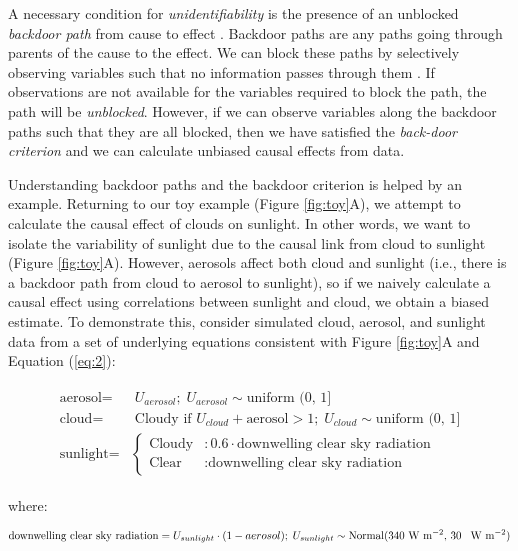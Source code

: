 \documentclass[12pt]{article}
\begin{document}
A necessary condition for \emph{unidentifiability} is the presence of
an unblocked \emph{backdoor path} from cause to effect \citep[][,
Ch. 3]{pearl2009causality}. Backdoor paths are any paths going
through parents of the cause to the effect. We can block these paths
by selectively observing variables such that no information passes
through them \citep{geiger-d-sep}. If observations are not available
for the variables required to block the path, the path will be
\emph{unblocked}. However, if we can observe variables along the
backdoor paths such that they are all blocked, then we have satisfied
the \emph{back-door criterion} \citep{pearl2009} and we can calculate
unbiased causal effects from data.

Understanding backdoor paths and the backdoor criterion is helped by
an example. Returning to our toy example (Figure \ref{fig:toy}A), we
attempt to calculate the causal effect of clouds on sunlight. In other
words, we want to isolate the variability of sunlight due to the
causal link from cloud to sunlight (Figure \ref{fig:toy}A). However,
aerosols affect both cloud and sunlight (i.e., there is a backdoor
path from cloud to aerosol to sunlight), so if we naively calculate a
causal effect using correlations between sunlight and cloud, we obtain
a biased estimate. To demonstrate this, consider simulated cloud,
aerosol, and sunlight data from a set of underlying equations
consistent with Figure \ref{fig:toy}A and Equation (\ref{eq:2}):


\begin{align}
  \begin{split}
    \text{aerosol} =& \; U_{aerosol}; \; U_{aerosol} \sim
    \text{uniform (0, 1]}\\ \text{cloud} =& \; \text{Cloudy if } U_{cloud} +
    \text{aerosol} > 1; \; U_{cloud} \sim \text{uniform (0, 1]}\\ \text{sunlight}
    =& \begin{cases} \text{Cloudy} &: 0.6 \cdot \text{downwelling clear
        sky radiation} \\ \text{Clear} &: \text{downwelling clear sky
        radiation}
    \end{cases}
    \label{eq:1}
  \end{split}
\end{align}

where:

\begin{equation*} \text{downwelling clear sky radiation} =
  U_{sunlight} \cdot (1 - aerosol); \; U_{sunlight} \sim
  \text{Normal(340 W m$^{-2}$, 30 \, W m$^{-2}$)}
\end{equation*}
\end{document}
